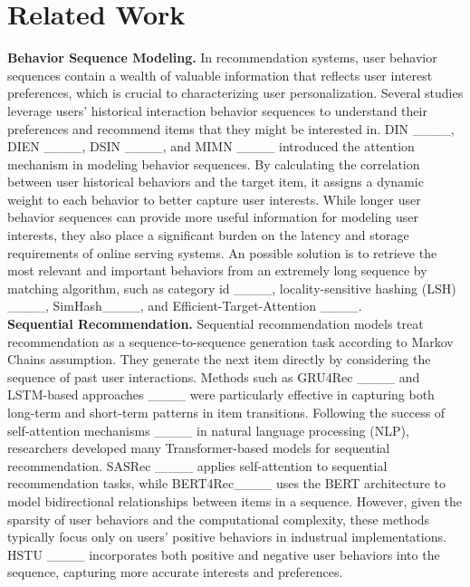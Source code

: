 \section{Related Work}
\textbf{Behavior Sequence Modeling.} 
In recommendation systems, user behavior sequences contain a wealth of valuable information that reflects user interest preferences, which is crucial to characterizing user personalization. Several studies leverage users' historical interaction behavior sequences to understand their preferences and recommend items that they might be interested in.
DIN ____, DIEN ____, DSIN ____, and MIMN ____ introduced the attention mechanism in modeling behavior sequences. By calculating the correlation between user historical behaviors and the target item, it assigns a dynamic weight to each behavior to better capture user interests. 
While longer user behavior sequences can provide more useful information for modeling user interests, they also place a significant burden on the latency and storage requirements of online serving systems. An possible solution is to retrieve the most relevant and important behaviors from an extremely long sequence by matching algorithm, such as category id ____, locality-sensitive hashing (LSH) ____, SimHash____, and Efficient-Target-Attention ____. \\

\noindent \textbf{Sequential Recommendation.}
Sequential recommendation models treat recommendation as a sequence-to-sequence generation task according to Markov Chains assumption.
They generate the next item directly by considering the sequence of past user interactions. 
Methods such as GRU4Rec ____ and LSTM-based approaches ____ were particularly effective in capturing both long-term and short-term patterns in item transitions. Following the success of self-attention mechanisms ____ in natural language processing (NLP), researchers developed many Transformer-based models for sequential recommendation. SASRec ____ applies self-attention to sequential recommendation tasks, while BERT4Rec____ uses the BERT architecture to model bidirectional relationships between items in a sequence. However, given the sparsity of user behaviors and the computational complexity, these methods typically focus only on users' positive behaviors in industrual implementations.
HSTU ____ incorporates both positive and negative user behaviors into the sequence, capturing more accurate interests and preferences. 
\\




